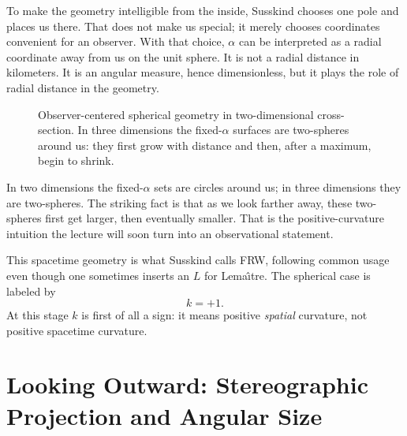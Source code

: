 To make the geometry intelligible from the inside, Susskind chooses one pole and places us there. That does not make us special; it merely chooses coordinates convenient for an observer. With that choice, \(\alpha\) can be interpreted as a radial coordinate away from us on the unit sphere. It is not a radial distance in kilometers. It is an angular measure, hence dimensionless, but it plays the role of radial distance in the geometry.

\begin{figure}[htbp]
\centering
{}%
\caption{Observer-centered spherical geometry in two-dimensional cross-section. In three dimensions the fixed-\(\alpha\) surfaces are two-spheres around us: they first grow with distance and then, after a maximum, begin to shrink.}
\end{figure}

In two dimensions the fixed-\(\alpha\) sets are circles around us; in three dimensions they are two-spheres. The striking fact is that as we look farther away, these two-spheres first get larger, then eventually smaller. That is the positive-curvature intuition the lecture will soon turn into an observational statement.

This spacetime geometry is what Susskind calls FRW, following common usage even though one sometimes inserts an \(L\) for Lema\^\i tre. The spherical case is labeled by
\begin{equation}
k=+1.
\end{equation}
At this stage \(k\) is first of all a sign: it means positive \emph{spatial} curvature, not positive spacetime curvature.

\section{Looking Outward: Stereographic Projection and Angular Size}

